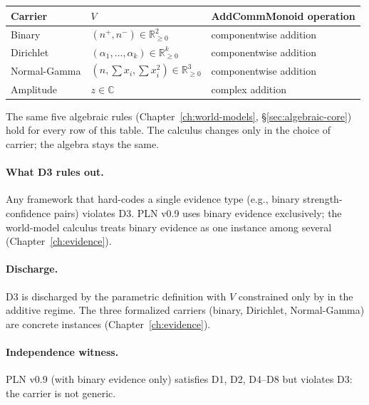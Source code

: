 \documentclass[11pt,openany]{report}
\begin{document}
\begin{center}
\begin{tabular}{lll}
\toprule
\textbf{Carrier} & \textbf{$V$} & \textbf{AddCommMonoid operation} \\
\midrule
Binary & $(n^+, n^-) \in \mathbb{R}_{\ge 0}^2$
  & componentwise addition \\
Dirichlet & $(\alpha_1, \ldots, \alpha_k) \in \mathbb{R}_{\ge 0}^k$
  & componentwise addition \\
Normal-Gamma & $(n, \sum x_i, \sum x_i^2) \in \mathbb{R}_{\ge 0}^3$
  & componentwise addition \\
Amplitude & $z \in \mathbb{C}$
  & complex addition \\
\bottomrule
\end{tabular}
\end{center}

\noindent
The same five algebraic rules (Chapter~\ref{ch:world-models},
\S\ref{sec:algebraic-core}) hold for every row of this table.  The
calculus changes only in the choice of carrier; the algebra stays
the same.

\paragraph{What D3 rules out.}
Any framework that hard-codes a single evidence type (e.g., binary
strength-confidence pairs) violates D3.  PLN v0.9 uses binary evidence
exclusively; the world-model calculus treats binary evidence as one
instance among several (Chapter~\ref{ch:evidence}).

\paragraph{Discharge.}
D3 is discharged by the parametric definition
\allowbreak{}
with $V$ constrained only by
\code{[AddCommMonoid V]} in the additive regime.  The three
formalized carriers (binary, Dirichlet, Normal-Gamma) are concrete
instances (Chapter~\ref{ch:evidence}).

\paragraph{Independence witness.}
PLN v0.9 (with binary evidence only) satisfies D1, D2, D4--D8 but
violates D3: the carrier is not generic.

\end{document}
